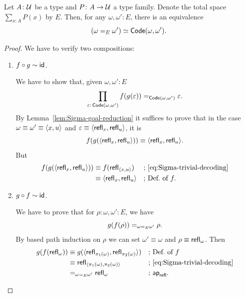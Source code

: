 \begin{thm}\label{thm:pair-equivalence}
    Let\/ $A\colon\univ$ be a type and\/ $P\colon A\to\univ$ a type family. Denote the total space\/ $\sum_{x\colon A}P(x)$ by\/ $E$. Then, for any\/ $\omega,\omega'\colon E$, there is an equivalence
    \[
        (\omega\mathrel{=_{E}}\omega')\simeq\mathsf{Code}(\omega,\omega').
    \]
\end{thm}

\begin{proof}
    We have to verify two compositions:
    \begin{enumerate}
        \item $f\circ g\sim\mathsf{id}$.

        We have to show that, given $\omega,\omega'\colon E$
        \[
            \prod_{\varepsilon\colon\fun{Code}(\omega,\omega')}
            f(g(\varepsilon))
            \eq{\fun{Code}
            (\omega,\omega')}\varepsilon.
        \]
        By Lemma~\ref{lem:Sigma-goal-reduction} it suffices to prove that in the case $\omega\equiv\omega'\equiv\langle x,u\rangle$ and $\varepsilon\equiv\langle\mathsf{refl}_x,\mathsf{refl}_u\rangle$, it is
        \[
            f(g(\langle\mathsf{refl}_x,\mathsf{refl}_u\rangle))
            \equiv
            \langle\mathsf{refl}_x,\mathsf{refl}_u\rangle.
        \]
        But
        \begin{align*}
            f(g(\langle\mathsf{refl}_x,\mathsf{refl}_u\rangle))
                &\equiv f(\mathsf{refl}_{\langle x,u\rangle})
                    &&\text{; \eqref{eq:Sigma-trivial-decoding}}\\
                &\equiv\langle\mathsf{refl}_x,\mathsf{refl}_u\rangle
                    &&\text{; Def.~of }f.
        \end{align*}

        \item $g\circ f\sim\mathsf{id}$.

        We have to prove that for $\rho\colon\omega,\omega'\colon E$, we have
        \[
            g(f(\rho))
            \mathrel{=_{\omega\mathrel{=_{E}}\omega'}}
            \rho.
        \]
        By based path induction on $\rho$ we can set $\omega'\equiv\omega$ and $\rho\equiv\mathsf{refl}_\omega$. Then
        \begin{align*}
            g(f(\mathsf{refl}_\omega))
                &\equiv g(
                    \langle
                        \mathsf{refl}_{\pi_1(\omega)},
                        \mathsf{refl}_{\pi_2(\omega)}
                    \rangle
                )
                    &&\text{; Def.~of }f\\
                &\equiv\mathsf{refl}_{
                        \langle\pi_1(\omega),\pi_2(\omega)\rangle
                    }
                    &&\text{;
                        \eqref{eq:Sigma-trivial-decoding}}\\
                &\mathrel{=_{\omega\mathrel{=_{E}}\omega'}}
                    \mathsf{refl}_\omega
                    &&\text{; }\mathsf{ap}_{\mathsf{refl}}.
        \end{align*}
    \end{enumerate}
\end{proof}

